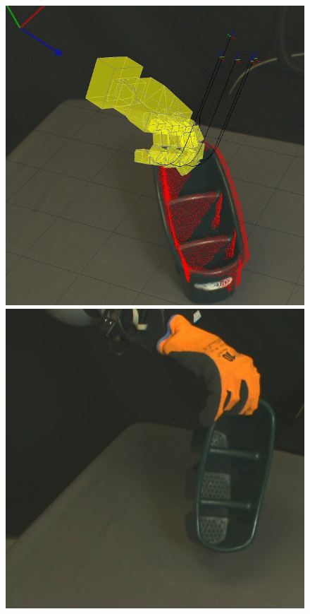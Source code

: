 \begin{figure}
\begin{center}
  \includegraphics[width=\tw]{images/experiments/query/stand1-1-s}
 \includegraphics[width=\tw]{images/experiments/exec/stand1-s}

\end{center}
\end{figure}
